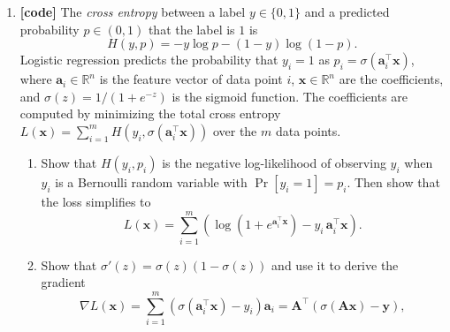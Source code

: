 \documentclass[letterpaper]{article}
\newcommand{\Real}{\mathbb{R}}
\newcommand{\tr}{^\top}
\newcommand{\opt}{^\star}
\begin{document}
\begin{enumerate}
  \[
    f(\bm{x}) = \| \bm{A} \bm{x} - \bm{b} \|^2 + \lambda \| \bm{x} \|^2,
  \]
  for some regularization parameter $\lambda > 0$.
  \begin{enumerate}
  \item Derive the gradient and the Hessian of $f$, and show that $f$ is convex.
  \item Use the first-order optimality conditions to show that the ridge regression solution is $\bm{x}\opt = (\bm{A}\tr \bm{A} + \lambda \bm{I})^{-1} \bm{A}\tr \bm{b}$.
  \item Show that $\bm{A}\tr \bm{A} + \lambda \bm{I}$ is positive definite, and hence invertible, for every $\lambda > 0$, even when the columns of $\bm{A}$ are linearly dependent (for example, when $m < n$). Why does this matter in contrast with the least-squares solution $(\bm{A}\tr \bm{A})^{-1} \bm{A}\tr \bm{b}$?
  \item \textbf{[code]} Compute the ridge regression solution for the data set in Problem~\ref{item:linreg}(d) with $\lambda=0.001$. What is the residual sum of squares $\| \bm{A}\bm{x}\opt - \bm{b} \|^2$?
  \end{enumerate}
\item \textbf{[code]} The \emph{cross entropy} between a label $y \in \{0, 1\}$ and a predicted probability $p \in (0, 1)$ that the label is $1$ is
  \[
    H(y, p) = - y \log p - (1 - y) \log (1 - p).
  \]
  Logistic regression predicts the probability that $y_i = 1$ as $p_i = \sigma(\bm{a}_i\tr \bm{x})$, where $\bm{a}_i \in \Real^n$ is the feature vector of data point $i$, $\bm{x} \in \Real^n$ are the coefficients, and $\sigma(z) = 1 / (1 + e^{-z})$ is the sigmoid function. The coefficients are computed by minimizing the total cross entropy $L(\bm{x}) = \sum_{i=1}^m H(y_i, \sigma(\bm{a}_i\tr \bm{x}))$ over the $m$ data points.
  \begin{enumerate}
  \item Show that $H(y_i, p_i)$ is the negative log-likelihood of observing $y_i$ when $y_i$ is a Bernoulli random variable with $\Pr[y_i = 1] = p_i$. Then show that the loss simplifies to
    \[
      L(\bm{x}) = \sum_{i=1}^m \left( \log\left(1 + e^{\bm{a}_i\tr \bm{x}}\right) - y_i\, \bm{a}_i\tr \bm{x} \right).
    \]
  \item Show that $\sigma'(z) = \sigma(z) (1 - \sigma(z))$ and use it to derive the gradient
    \[
      \nabla L(\bm{x}) = \sum_{i=1}^m \left( \sigma(\bm{a}_i\tr \bm{x}) - y_i \right) \bm{a}_i = \bm{A}\tr \left( \sigma(\bm{A}\bm{x}) - \bm{y} \right),
\]
\end{enumerate}
\end{enumerate}
\end{document}
